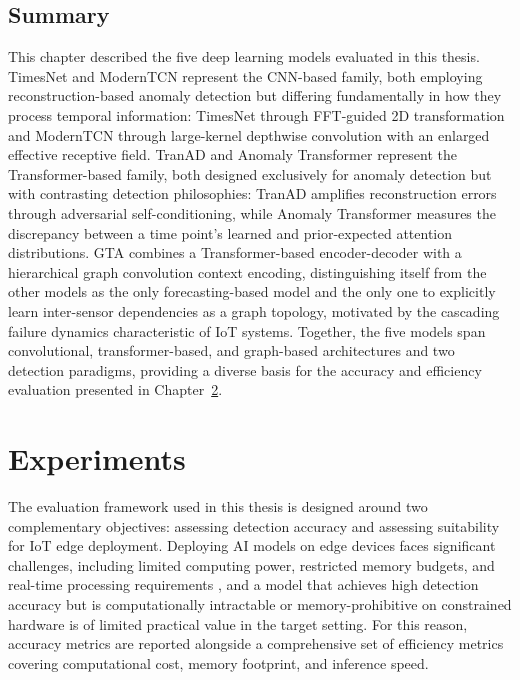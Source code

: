 \documentclass[twoside,11pt,openright]{report}
\begin{document}
\section{Summary}
This chapter described the five deep learning models evaluated in this thesis. 
TimesNet \citep{timesnet2023} and ModernTCN \citep{moderntcn2024} represent the 
CNN-based family, both employing reconstruction-based 
anomaly detection but differing fundamentally in how they process temporal information: 
TimesNet through FFT-guided 2D transformation and ModernTCN through large-kernel depthwise 
convolution with an enlarged effective receptive field. TranAD \citep{tranad2022} and 
Anomaly Transformer \citep{anomalytransformer2022}
represent the Transformer-based family, both designed exclusively for anomaly detection 
but with contrasting detection philosophies: TranAD amplifies reconstruction errors through 
adversarial self-conditioning, while Anomaly Transformer measures the discrepancy between 
a time point's learned and prior-expected attention distributions. GTA \citep{gta2022} combines a 
Transformer-based encoder-decoder with a hierarchical graph convolution context encoding, 
distinguishing itself from the other models as the only forecasting-based model and 
the only one to explicitly learn inter-sensor dependencies as a graph topology, 
motivated by the cascading failure dynamics characteristic of IoT systems. Together, 
the five models span convolutional, transformer-based, and graph-based architectures 
and two detection paradigms, providing a diverse basis for the accuracy and efficiency 
evaluation presented in Chapter~\ref{ch:experiments}.



\chapter{Experiments}
\label{ch:experiments}

The evaluation framework used in this thesis is designed around two complementary 
objectives: assessing detection accuracy and assessing suitability for IoT edge 
deployment.
Deploying AI models on edge devices faces significant challenges, including 
limited computing power, restricted memory budgets, and real-time processing requirements 
\citep{wang2025optimizing}, and a model that achieves high detection accuracy but is 
computationally intractable or memory-prohibitive on constrained hardware is of limited 
practical value in the target setting. For this reason, accuracy metrics are reported 
alongside a comprehensive set of efficiency metrics covering computational cost, memory 
footprint, and inference speed. 
\end{document}
